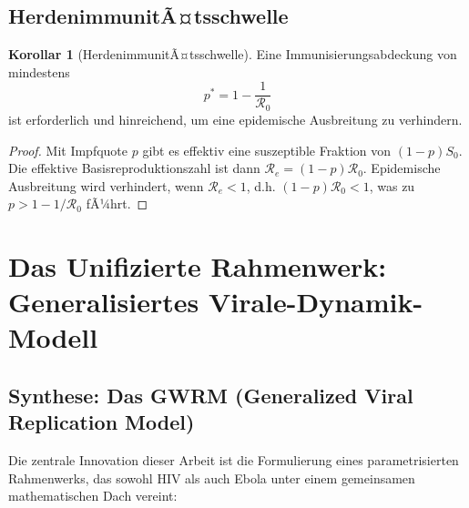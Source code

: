 ﻿\documentclass[a4paper,12pt]{article}
\theoremstyle{definition}
\newtheorem{korollar}{Korollar}
\begin{document}
\subsection{HerdenimmunitÃ¤tsschwelle}

\begin{korollar}[HerdenimmunitÃ¤tsschwelle]
Eine Immunisierungsabdeckung von mindestens
\[
p^* = 1 - \frac{1}{\mathcal{R}_0}
\]
ist erforderlich und hinreichend, um eine epidemische Ausbreitung zu verhindern.
\end{korollar}

\begin{proof}
Mit Impfquote $p$ gibt es effektiv eine suszeptible Fraktion von $(1-p) S_0$. Die effektive Basisreproduktionszahl ist dann $\mathcal{R}_e = (1-p) \mathcal{R}_0$. Epidemische Ausbreitung wird verhindert, wenn $\mathcal{R}_e < 1$, d.h. $(1-p) \mathcal{R}_0 < 1$, was zu $p > 1 - 1/\mathcal{R}_0$ fÃ¼hrt.
\end{proof}

\section{Das Unifizierte Rahmenwerk: Generalisiertes Virale-Dynamik-Modell}

\subsection{Synthese: Das GWRM (Generalized Viral Replication Model)}

Die zentrale Innovation dieser Arbeit ist die Formulierung eines parametrisierten Rahmenwerks, das sowohl HIV als auch Ebola unter einem gemeinsamen mathematischen Dach vereint:
\end{document}
